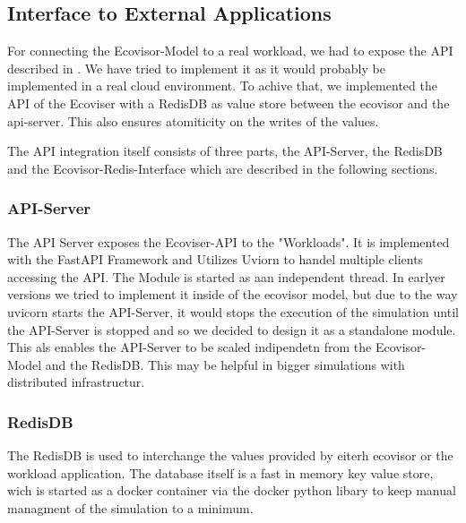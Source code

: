 \subsection{Interface to External Applications}

For connecting the Ecovisor-Model to a real workload, we had to expose the API described in \cite{souza2023}. We have tried to implement it as it would probably be implemented in a real cloud environment. %
To achive that, we implemented the API of the Ecoviser with a RedisDB as value store between the ecovisor and the api-server. This also ensures atomiticity on the writes of the values. %

The API integration itself consists of three parts, the API-Server, the RedisDB and the Ecovisor-Redis-Interface which are described in the following sections.



\subsubsection{API-Server}
The API Server exposes the Ecoviser-API to the "Workloads". It is implemented with the FastAPI Framework and Utilizes Uviorn to handel multiple clients accessing the API.
The Module is started as aan independent thread. In earlyer versions we tried to implement it inside of the ecovisor model, but due to the way uvicorn starts the API-Server,
it would stops the execution of the simulation until the API-Server is stopped and so we decided to design it as a standalone module. This als enables the API-Server to be scaled indipendetn from
the Ecovisor-Model and the RedisDB. This may be helpful in bigger simulations with distributed infrastructur. 


\subsubsection{RedisDB}
The RedisDB is used to interchange the values provided by eiterh ecovisor or the workload application. The database itself is a fast in memory key value store, wich is started as a docker container via the docker python libary %
to keep manual managment of the simulation to a minimum.

